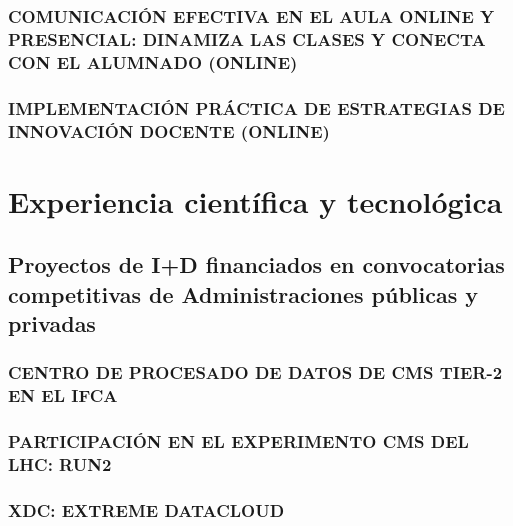 \documentclass[a4paper, 11pt, twoside, openright]{report}
\begin{document}
\subsection{COMUNICACIÓN EFECTIVA EN EL AULA ONLINE Y PRESENCIAL: DINAMIZA LAS CLASES Y CONECTA CON EL ALUMNADO (ONLINE)}


\subsection{IMPLEMENTACIÓN PRÁCTICA DE ESTRATEGIAS DE INNOVACIÓN DOCENTE (ONLINE)}


\chapter{Experiencia científica y tecnológica}

\section{Proyectos de I+D financiados en convocatorias competitivas de Administraciones públicas y privadas}


\subsection{CENTRO DE PROCESADO DE DATOS DE CMS TIER-2 EN EL IFCA}


\subsection{PARTICIPACIÓN EN EL EXPERIMENTO CMS DEL LHC: RUN2}


\subsection{XDC: EXTREME DATACLOUD}

\end{document}
